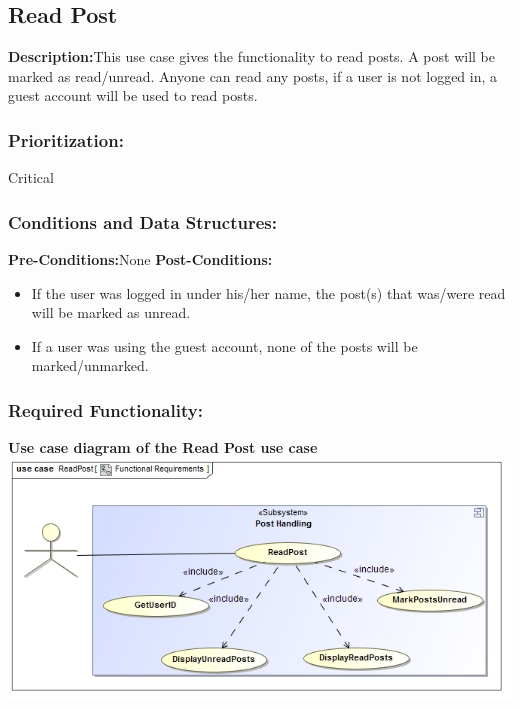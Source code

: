 \documentclass[a4paper,11pt]{article}
\begin{document}
\subsection{Read Post}
\textbf{Description:}This use case gives the functionality to read posts. A post will be marked as read/unread. Anyone can read any posts, if a user is not logged in, a guest account will be used to read posts.
\subsubsection{Prioritization:} Critical
\subsubsection{Conditions and Data Structures:}
\textbf{Pre-Conditions:}None
\textbf{Post-Conditions:}
\begin{itemize}
	\item If the user was logged in under his/her name, the post(s) that was/were read will be marked as unread.
	\item If a user was using the guest account, none of the posts will be marked/unmarked.
\end{itemize}
\subsubsection{Required Functionality:} 
\textbf{Use case diagram of the Read Post use case}\\
\includegraphics[width=1\linewidth]{./Images/PostHandling/postRead.jpg}\\
\end{document}
